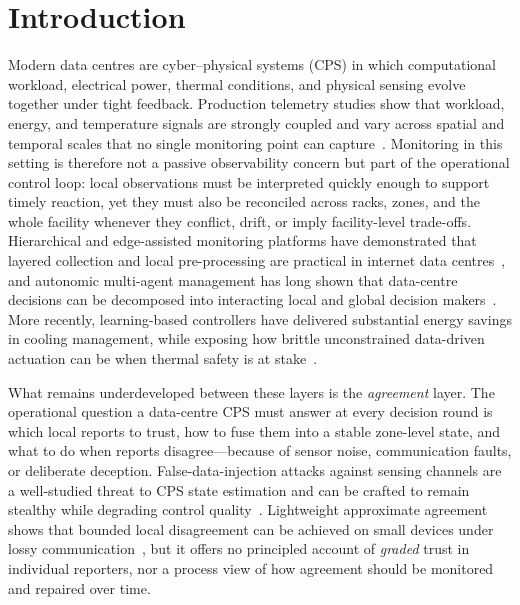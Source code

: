\documentclass[preprint,11pt]{elsarticle}
\begin{document}
\section{Introduction}
\label{sec:introduction}

Modern data centres are cyber--physical systems (CPS) in which
computational workload, electrical power, thermal conditions, and
physical sensing evolve together under tight feedback. Production
telemetry studies show that workload, energy, and temperature signals
are strongly coupled and vary across spatial and temporal scales that
no single monitoring point can capture~\cite{ilager2023}. Monitoring in
this setting is therefore not a passive observability concern but part
of the operational control loop: local observations must be interpreted
quickly enough to support timely reaction, yet they must also be
reconciled across racks, zones, and the whole facility whenever they
conflict, drift, or imply facility-level trade-offs. Hierarchical and
edge-assisted monitoring platforms have demonstrated that layered
collection and local pre-processing are practical in internet data
centres~\cite{jiang2019,yan2021}, and autonomic multi-agent management
has long shown that data-centre decisions can be decomposed into
interacting local and global decision makers~\cite{das2008,tesauro2004}.
More recently, learning-based controllers have delivered substantial
energy savings in cooling management, while exposing how brittle
unconstrained data-driven actuation can be when thermal safety is at
stake~\cite{wang2024tcps,ran2023event}.

What remains underdeveloped between these layers is the
\emph{agreement} layer. The operational question a data-centre CPS must
answer at every decision round is which local reports to trust, how to
fuse them into a stable zone-level state, and what to do when reports
disagree---because of sensor noise, communication faults, or deliberate
deception. False-data-injection attacks against sensing channels are a
well-studied threat to CPS state estimation and can be crafted to
remain stealthy while degrading control quality~\cite{padhan2022}.
Lightweight approximate agreement shows that bounded local disagreement
can be achieved on small devices under lossy
communication~\cite{zhang2021approx}, but it offers no principled
account of \emph{graded} trust in individual reporters, nor a process
view of how agreement should be monitored and repaired over time.
\end{document}
